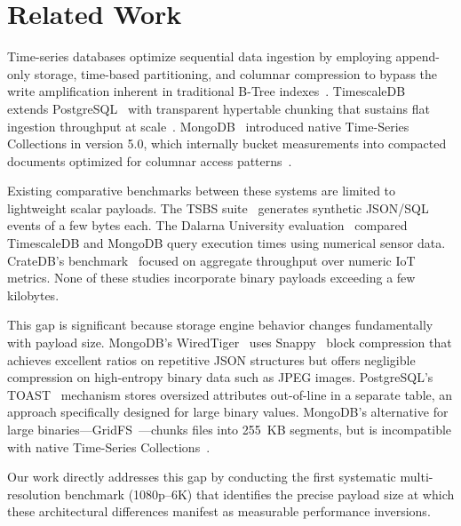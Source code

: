 \documentclass[conference]{IEEEtran}
\begin{document}
\section{Related Work}
\label{sec:related_work}

Time-series databases optimize sequential data ingestion by employing append-only storage, time-based partitioning, and columnar compression to bypass the write amplification inherent in traditional B-Tree indexes~\cite{dewaal_timeseries_survey,jensen_tsms_survey}. TimescaleDB~\cite{timescaledb_official} extends PostgreSQL~\cite{postgresql_official} with transparent hypertable chunking that sustains flat ingestion throughput at scale~\cite{dewaal_timeseries_survey,nerc_tsdb_survey}. MongoDB~\cite{mongodb_official} introduced native Time-Series Collections in version 5.0, which internally bucket measurements into compacted documents optimized for columnar access patterns~\cite{tigerdata_mongodb_timescaledb,maddevs_timescaledb_beats_pg}.

Existing comparative benchmarks between these systems are limited to lightweight scalar payloads. The TSBS suite~\cite{tsbs} generates synthetic JSON/SQL events of a few bytes each. The Dalarna University evaluation~\cite{diva_timescaledb_mongodb_eval} compared TimescaleDB and MongoDB query execution times using numerical sensor data. CrateDB's benchmark~\cite{cratedb_ts_benchmark} focused on aggregate throughput over numeric IoT metrics. None of these studies incorporate binary payloads exceeding a few kilobytes.

This gap is significant because storage engine behavior changes fundamentally with payload size. MongoDB's WiredTiger~\cite{mongodb_wiredtiger_storage} uses Snappy~\cite{google_snappy} block compression that achieves excellent ratios on repetitive JSON structures but offers negligible compression on high-entropy binary data such as JPEG images. PostgreSQL's TOAST~\cite{postgresql_toast_docs} mechanism stores oversized attributes out-of-line in a separate table, an approach specifically designed for large binary values. MongoDB's alternative for large binaries---GridFS~\cite{mongodb_gridfs}---chunks files into 255~KB segments, but is incompatible with native Time-Series Collections~\cite{mongodb_ts_limitations}.

Our work directly addresses this gap by conducting the first systematic multi-resolution benchmark (1080p--6K) that identifies the precise payload size at which these architectural differences manifest as measurable performance inversions.
\end{document}
